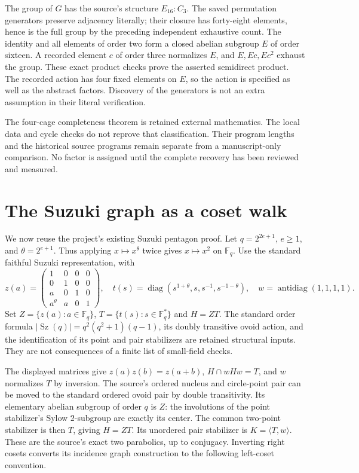 \documentclass[11pt,a4paper]{article}
\newcommand{\F}{\mathbb F}
\newcommand{\gen}[1]{\langle #1\rangle}
\begin{document}
The group of $G$ has the source's structure $E_{16}:C_3$.
The saved permutation generators preserve adjacency literally;
their closure has forty-eight elements, hence is the full group
by the preceding independent exhaustive count. The identity and
all elements of order two form a closed abelian subgroup $E$ of
order sixteen. A recorded element $c$ of order three normalizes
$E$, and $E,Ec,Ec^2$ exhaust the group. These exact product checks
prove the asserted semidirect product. The recorded action has
four fixed elements on $E$, so the action is specified as well
as the abstract factors. Discovery of the generators is not an
extra assumption in their literal verification.

The four-cage completeness theorem is retained external mathematics.
The local data and cycle checks do not reprove that classification.
Their program lengths and the historical source programs remain
separate from a manuscript-only comparison. No factor is assigned
until the complete recovery has been reviewed and measured.

\section{The Suzuki graph as a coset walk}
We now reuse the project's existing Suzuki pentagon proof. Let
$q=2^{2e+1}$, $e\geq1$, and $\theta=2^{e+1}$. Thus applying
$x\mapsto x^\theta$ twice gives $x\mapsto x^2$ on $\F_q$.
Use the standard faithful Suzuki representation, with
\[
 z(a)=\begin{pmatrix}
 1&0&0&0\\0&1&0&0\\a&0&1&0\\a^\theta&a&0&1
 \end{pmatrix},\quad
 t(s)=\operatorname{diag}(s^{1+\theta},s,s^{-1},s^{-1-\theta}),
 \quad w=\operatorname{antidiag}(1,1,1,1).
\]
Set $Z=\{z(a):a\in\F_q\}$, $T=\{t(s):s\in\F_q^*\}$ and
$H=ZT$. The standard order formula
$|\operatorname{Sz}(q)|=q^2(q^2+1)(q-1)$, its doubly transitive
ovoid action, and the identification of its point and pair stabilizers
are retained structural inputs. They are not consequences of a
finite list of small-field checks.

The displayed matrices give $z(a)z(b)=z(a+b)$,
$H\cap wHw=T$, and $w$ normalizes $T$ by inversion.
The source's ordered nucleus and circle-point pair can be moved to
the standard ordered ovoid pair by double transitivity. Its elementary
abelian subgroup of order $q$ is $Z$: the involutions of the point
stabilizer's Sylow $2$-subgroup are exactly its center. The common
two-point stabilizer is then $T$, giving $H=ZT$. Its unordered pair
stabilizer is $K=\gen{T,w}$. These are the source's exact two
parabolics, up to conjugacy. Inverting right cosets converts its
incidence graph construction to the following left-coset convention.
\end{document}

